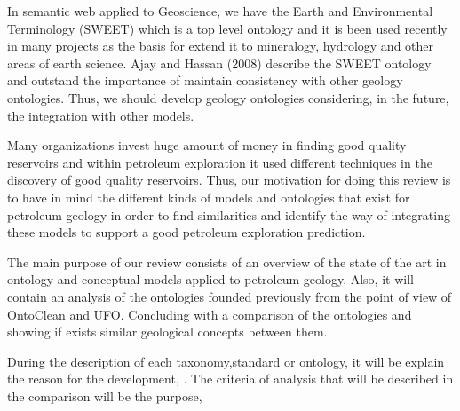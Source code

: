 In semantic web applied to Geoscience, we have the Earth and Environmental Terminology (SWEET) which is a top level ontology and it is been used recently in many projects as the basis for extend it to mineralogy, hydrology and other areas of earth science. Ajay and Hassan (2008) describe the SWEET ontology and outstand the importance of maintain consistency with other geology ontologies. Thus, we should develop geology ontologies considering, in the future, the integration with other models. 

Many organizations invest huge amount of money in finding good quality reservoirs and within petroleum exploration it used different techniques in the discovery of good quality reservoirs. Thus, our motivation for doing this review is to have in mind the different kinds of models and ontologies that exist for petroleum geology in order to find similarities and identify the way of integrating these models to support a good petroleum exploration prediction.

The main purpose of our review consists of an overview of the state of the art in ontology and conceptual models applied to petroleum geology. Also, it will contain an analysis of the ontologies founded previously from the point of view of OntoClean and UFO. Concluding with a comparison of the ontologies and showing if exists similar geological concepts between them.

During the description of each taxonomy,standard or ontology, it will be explain the reason for the development, . The criteria of analysis that will be described in the comparison will be the purpose,